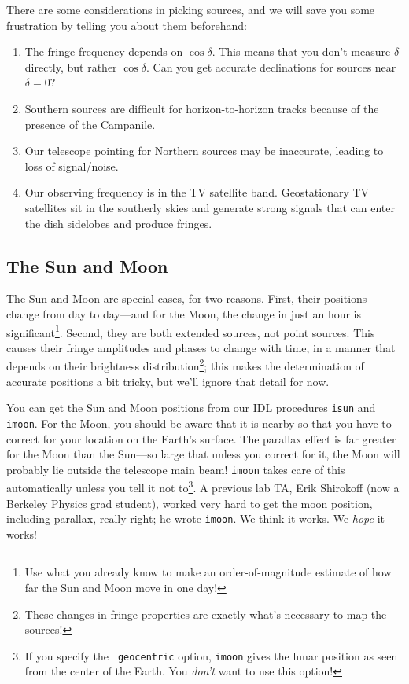 \documentclass[11pt,preprint]{aastex}
\begin{document}
	There are some considerations in picking sources, and we will
save you some frustration by telling you about them beforehand:
\begin{enumerate}


	\item The fringe frequency depends on $\cos \delta$. This
means that you don't measure $\delta$ directly, but rather $\cos
\delta$. Can you get accurate declinations for sources near $\delta =
0$?

	\item Southern sources are difficult for horizon-to-horizon
tracks because of the presence of the Campanile. 

	\item Our telescope pointing for Northern sources may be
inaccurate, leading to loss of signal/noise. 

	\item Our observing frequency is in the TV satellite band. 
Geostationary TV satellites sit in the southerly skies and generate
strong signals that can enter the dish sidelobes and produce fringes. 

\end{enumerate}

\subsection{The Sun and Moon}

	The Sun and Moon are special cases, for two reasons. First, 
their positions change from day to day---and for the Moon, the change in
just an hour is significant\footnote{Use what you already know to make
an order-of-magnitude estimate of how far the Sun and Moon move in one
day!}.  Second, they are both extended sources, not point sources. This
causes their fringe amplitudes and phases to change with time, in a
manner that depends on their brightness distribution\footnote{These
changes in fringe properties are exactly what's necessary to map the
sources!}; this makes the determination of accurate positions a bit
tricky, but we'll ignore that detail for now.

	You can get the Sun and Moon positions from our IDL procedures
{\tt isun} and {\tt imoon}.  For the Moon, you should be aware that it
is nearby so that you have to correct for your location on the Earth's
surface. The parallax effect is far greater for the Moon than the
Sun---so large that unless you correct for it, the Moon will probably
lie outside the telescope main beam! {\tt imoon} takes care of this
automatically unless you tell it not to\footnote{If you specify the {\tt
geocentric} option, {\tt imoon} gives the lunar position as seen from
the center of the Earth. You {\it don't} want to use this option!}.  A
previous lab TA, Erik Shirokoff (now a Berkeley Physics grad student),
worked very hard to get the moon position, including parallax, really
right; he wrote {\tt imoon}. We think it works. We {\it hope} it works!
\end{document}
